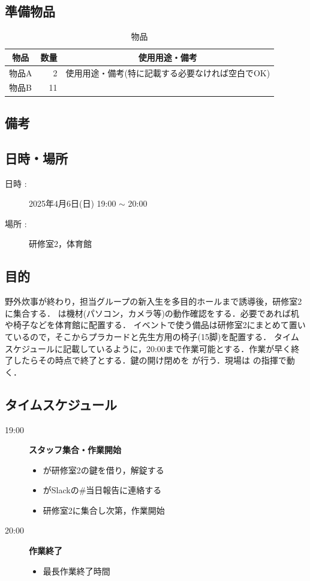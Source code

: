 \subsection{準備物品}
\begin{table}[h]
  \centering
  \caption{物品}
  \begin{tabular}{lrl}
    \hline
    \multicolumn{1}{c}{物品} & \multicolumn{1}{c}{数量} & \multicolumn{1}{c}{使用用途・備考} \\
    \hline
    物品A & 2 & 使用用途・備考(特に記載する必要なければ空白でOK) \\
    物品B & 11 &  \\
    \hline  
  \end{tabular}
\end{table}

\subsection{備考}



\subsection{日時・場所}
\begin{description}
  \item[日時 :] 2025年4月6日(日) 19:00 $\sim$ 20:00
  \item[場所 :] 研修室2，体育館
\end{description}

\subsection{目的}
野外炊事が終わり，担当グループの新入生を多目的ホールまで誘導後，研修室2に集合する．
  は機材(パソコン，カメラ等)の動作確認をする．必要であれば机や椅子などを体育館に配置する．
イベントで使う備品は研修室2にまとめて置いているので，そこからプラカードと先生方用の椅子(15脚)を配置する．
タイムスケジュールに記載しているように，20:00まで作業可能とする．作業が早く終了したらその時点で終了とする．鍵の開け閉めを  が行う．現場は  の指揮で動く．

\subsection{タイムスケジュール}
\begin{description}
  \item[19:00] \textbf{スタッフ集合・作業開始}
  \begin{itemize}
    \item   が研修室2の鍵を借り，解錠する
    \item   がSlackの\#当日報告に連絡する
    \item 研修室2に集合し次第，作業開始
  \end{itemize}

  \item[20:00] \textbf{作業終了}
  \begin{itemize}
    \item 最長作業終了時間
  \end{itemize}
\end{description}

